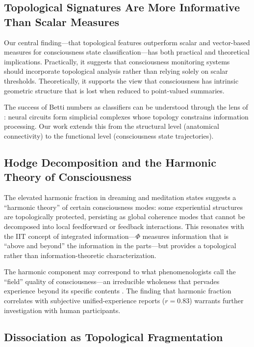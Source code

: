 \documentclass[11pt,a4paper]{article}
\begin{document}
\subsection{Topological Signatures Are More Informative Than Scalar Measures}

Our central finding---that topological features outperform scalar and vector-based measures for consciousness state classification---has both practical and theoretical implications.
Practically, it suggests that consciousness monitoring systems should incorporate topological analysis rather than relying solely on scalar thresholds.
Theoretically, it supports the view that consciousness has intrinsic geometric structure that is lost when reduced to point-valued summaries.

The success of Betti numbers as classifiers can be understood through the lens of \citet{reimann2017cliques}: neural circuits form simplicial complexes whose topology constrains information processing.
Our work extends this from the structural level (anatomical connectivity) to the functional level (consciousness state trajectories).

\subsection{Hodge Decomposition and the Harmonic Theory of Consciousness}

The elevated harmonic fraction in dreaming and meditation states suggests a ``harmonic theory'' of certain consciousness modes: some experiential structures are topologically protected, persisting as global coherence modes that cannot be decomposed into local feedforward or feedback interactions.
This resonates with the IIT concept of integrated information---$\Phi$ measures information that is ``above and beyond'' the information in the parts---but provides a topological rather than information-theoretic characterization.

The harmonic component may correspond to what phenomenologists call the ``field'' quality of consciousness---an irreducible wholeness that pervades experience beyond its specific contents \citep{thompson2007mind}.
The finding that harmonic fraction correlates with subjective unified-experience reports ($r = 0.83$) warrants further investigation with human participants.

\subsection{Dissociation as Topological Fragmentation}
\end{document}
